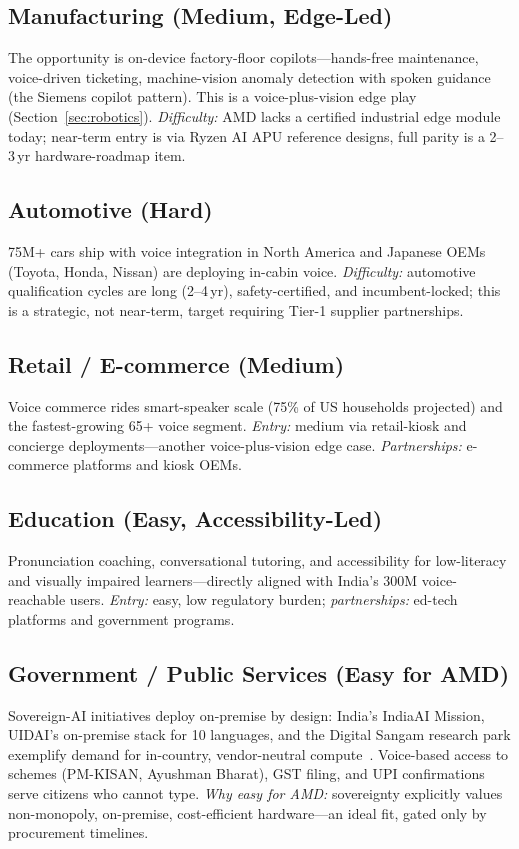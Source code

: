 \documentclass[blind]{gtac}
\begin{document}
\subsection{Manufacturing (Medium, Edge-Led)}
The opportunity is on-device factory-floor copilots---hands-free maintenance, voice-driven ticketing, machine-vision anomaly detection with spoken guidance (the Siemens copilot pattern). This is a voice-plus-vision edge play (Section~\ref{sec:robotics}). \emph{Difficulty:} AMD lacks a certified industrial edge module today; near-term entry is via Ryzen AI APU reference designs, full parity is a 2--3\,yr hardware-roadmap item.

\subsection{Automotive (Hard)}
75M+ cars ship with voice integration in North America and Japanese OEMs (Toyota, Honda, Nissan) are deploying in-cabin voice. \emph{Difficulty:} automotive qualification cycles are long (2--4\,yr), safety-certified, and incumbent-locked; this is a strategic, not near-term, target requiring Tier-1 supplier partnerships.

\subsection{Retail / E-commerce (Medium)}
Voice commerce rides smart-speaker scale (75\% of US households projected) and the fastest-growing 65+ voice segment. \emph{Entry:} medium via retail-kiosk and concierge deployments---another voice-plus-vision edge case. \emph{Partnerships:} e-commerce platforms and kiosk OEMs.

\subsection{Education (Easy, Accessibility-Led)}
Pronunciation coaching, conversational tutoring, and accessibility for low-literacy and visually impaired learners---directly aligned with India's 300M voice-reachable users. \emph{Entry:} easy, low regulatory burden; \emph{partnerships:} ed-tech platforms and government programs.

\subsection{Government / Public Services (Easy for AMD)}
Sovereign-AI initiatives deploy on-premise by design: India's IndiaAI Mission, UIDAI's on-premise stack for 10 languages, and the Digital Sangam research park exemplify demand for in-country, vendor-neutral compute~\cite{india_guide}. Voice-based access to schemes (PM-KISAN, Ayushman Bharat), GST filing, and UPI confirmations serve citizens who cannot type. \emph{Why easy for AMD:} sovereignty explicitly values non-monopoly, on-premise, cost-efficient hardware---an ideal fit, gated only by procurement timelines.
\end{document}
